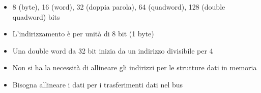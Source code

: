 \documentclass[arch.tex]{subfiles}
\begin{document}
%
\label{ppar:Tipi Dati Intel x86}


\begin{itemize}
	\item 8 (byte), 16 (word), 32 (doppia parola), 64 (quadword), 128 (double quadword) bits
	\item L'indirizzamento è per unità di 8 bit (1 byte)
	\item Una double word da 32 bit inizia da un indirizzo divisibile per 4
	\item Non si ha la necessità di allineare gli indirizzi per le strutture dati in memoria
	\item Bisogna allineare i dati per i trasferimenti dati nel bus
\end{itemize}

%
\label{ppar:Tipi di operazioni Intel x86}
\end{document}
